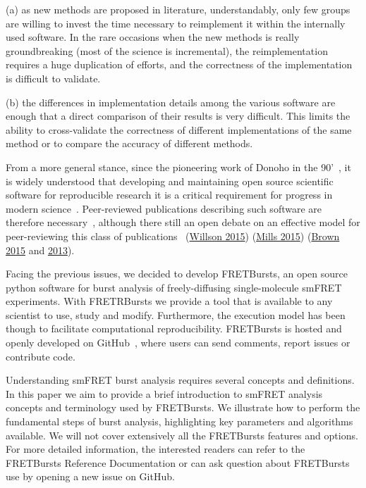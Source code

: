 (a) as new methods are proposed in literature, understandably, only few 
groups are willing to invest the time necessary to reimplement it within 
the internally used software. In the rare occasions when the new methods 
is really groundbreaking (most of the science is incremental), the reimplementation requires 
a huge duplication of efforts, and the correctness of the implementation
is difficult to validate.

(b) the differences in implementation details among the various software
are enough that a direct comparison of their results is very difficult. 
This limits the ability to cross-validate the correctness of different 
implementations of the same method or to compare the accuracy 
of different methods.

From a more general stance, since the pioneering work of Donoho in the 90'~\cite{Buckheit_1995}, 
it is widely understood that developing and maintaining open source scientific software
for reproducible research it is a critical requirement for progress in modern 
science~\cite{Ince_2012}. Peer-reviewed publications describing such software are therefore necessary~\cite{Pradal_2013}, 
although there still an open debate on an effective model for peer-reviewing this
class of publications~\cite{Check_Hayden_2013}\cite{Check_Hayden_2015} 
(\href{https://software-carpentry.org/blog/2015/04/quality-is-free-getting-there-isnt.html}{Willson 2015})
(\href{http://https://www.mozillascience.org/effective-code-review-for-journals}{Mills 2015})
(\href{http://http://ivory.idyll.org/blog/2015-we-live-in-a-bubble.html}{Brown 2015} and \href{http://http://ivory.idyll.org/blog/on-code-review-of-scientific-code.html}{2013}).

Facing the previous issues, we decided to develop FRETBursts, 
an open source python software for burst analysis of freely-diffusing
single-molecule smFRET experiments. 
With FRETRBursts we provide a tool that is available to any scientist
to use, study and modify. Furthermore, the execution model has been though
to facilitate computational reproducibility.
FRETBursts is hosted and openly developed on GitHub~\cite{Prli__2012}, 
where users can send comments, report issues or contribute code.

Understanding smFRET burst analysis requires several concepts and definitions.
In this paper we aim to provide a brief introduction to smFRET analysis concepts
and terminology used by FRETBursts. We illustrate how to perform
the fundamental steps of burst analysis, highlighting key parameters
and algorithms available. We will not cover extensively all the FRETBursts
features and options. For more detailed information, the interested readers can refer
to the FRETBursts Reference Documentation or can ask question about FRETBursts use by opening 
a new issue on GitHub.

